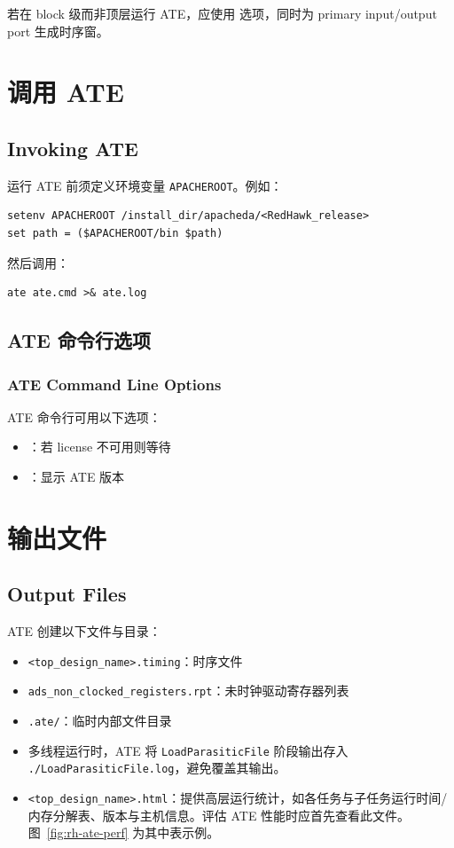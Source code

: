 若在 block 级而非顶层运行 ATE，应使用  选项，同时为 primary input/output port 生成时序窗。

\section{调用 ATE}
\subsection*{Invoking ATE}

运行 ATE 前须定义环境变量 \texttt{APACHEROOT}。例如：
\begin{lstlisting}
setenv APACHEROOT /install_dir/apacheda/<RedHawk_release>
set path = ($APACHEROOT/bin $path)
\end{lstlisting}

然后调用：
\begin{lstlisting}
ate ate.cmd >& ate.log
\end{lstlisting}

\subsection{ATE 命令行选项}
\subsubsection*{ATE Command Line Options}

ATE 命令行可用以下选项：
\begin{itemize}
  \item {}：若 license 不可用则等待
  \item {}：显示 ATE 版本
\end{itemize}

\section{输出文件}
\subsection*{Output Files}

ATE 创建以下文件与目录：
\begin{itemize}
  \item \texttt{<top\_design\_name>.timing}：时序文件
  \item \texttt{ads\_non\_clocked\_registers.rpt}：未时钟驱动寄存器列表
  \item \texttt{.ate/}：临时内部文件目录
  \item 多线程运行时，ATE 将 \texttt{LoadParasiticFile} 阶段输出存入 \texttt{./LoadParasiticFile.log}，避免覆盖其输出。
  \item \texttt{<top\_design\_name>.html}：提供高层运行统计，如各任务与子任务运行时间/内存分解表、版本与主机信息。评估 ATE 性能时应首先查看此文件。图~\ref{fig:rh-ate-perf} 为其中表示例。
\end{itemize}

